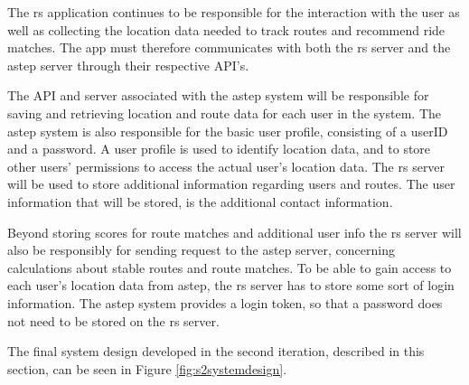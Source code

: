 The \gls{rs} application continues to be responsible for the interaction with the user as well as collecting the location data needed to track routes and recommend ride matches.
The app must therefore communicates with both the \gls{rs} server and the \gls{astep} server through their respective API's.


The API and server associated with the \gls{astep} system will be responsible for saving and retrieving location and route data for each user in the system.
The \gls{astep} system is also responsible for the basic user profile, consisting of a userID and a password.
A user profile is used to identify location data, and to store other users' permissions to access the actual user's location data.
The \gls{rs} server will be used to store additional information regarding users and routes.
The user information that will be stored, is the additional contact information.

Beyond storing scores for route matches and additional user info the \gls{rs} server will also be responsibly for sending request to the \gls{astep} server, concerning calculations about stable routes and route matches.
To be able to gain access to each user's location data from \gls{astep}, the \gls{rs} server has to store some sort of login information.
The \gls{astep} system provides a login token, so that a password does not need to be stored on the \gls{rs} server.


The final system design developed in the second iteration, described in this section, can be seen in Figure \ref{fig:s2systemdesign}.

